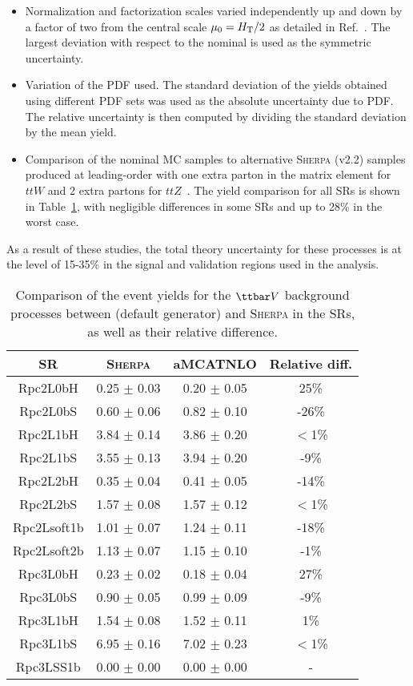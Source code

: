 \begin{itemize}
\item Normalization and factorization scales varied independently up and down by a factor of two from the central scale $\mu_0 = H_{\rm T}/2$ as detailed in Ref.~\cite{ATL-PHYS-PUB-2016-005}. 
The largest deviation with respect to the nominal is used as the symmetric uncertainty.
\item Variation of the PDF used.
The standard deviation of the yields obtained using different PDF sets was used as the absolute uncertainty due to PDF. 
The relative uncertainty is then computed by dividing the standard deviation by the mean yield.
\item Comparison of the nominal \AMCATNLO MC samples to alternative \textsc{Sherpa} (v2.2) samples produced at leading-order with one extra parton in the matrix element for $ttW$ and 2 extra partons 
for $ttZ$~\cite{ATL-PHYS-PUB-2016-005}. 
The yield comparison for all SRs is shown in Table~\ref{tab:ttVGenComp}, with negligible differences in some SRs and up to 28\% in the worst case.
\end{itemize}
As a result of these studies, the total theory uncertainty for these processes 
is at the level of 15-35\% in the signal and validation regions used in the 
analysis. 
\begin{table}[!htb]
\caption{Comparison of the event yields for the $\ttbar V$ background processes between \AMCATNLO (default generator) and \textsc{Sherpa} in the SRs, as well as their relative difference.
}
\label{tab:ttVGenComp}
\def\arraystretch{1.1}
\centering
\begin{tabular}{|c|c|c|c|}
\hline\hline
   SR    & \textsc{Sherpa} & aMCATNLO & Relative diff.\\ \hline
Rpc2L0bH   &   0.25 $\pm$ 0.03   &   0.20 $\pm$ 0.05   &   25\% \\
Rpc2L0bS   &   0.60 $\pm$ 0.06   &   0.82 $\pm$ 0.10   &   -26\% \\
Rpc2L1bH   &   3.84 $\pm$ 0.14   &   3.86 $\pm$ 0.20   &   $<$1\% \\
Rpc2L1bS   &   3.55 $\pm$ 0.13   &   3.94 $\pm$ 0.20   &   -9\% \\
Rpc2L2bH   &   0.35 $\pm$ 0.04   &   0.41 $\pm$ 0.05   &   -14\% \\
Rpc2L2bS   &   1.57 $\pm$ 0.08   &   1.57 $\pm$ 0.12   &   $<$1\% \\
Rpc2Lsoft1b   &   1.01 $\pm$ 0.07   &   1.24 $\pm$ 0.11   &   -18\% \\
Rpc2Lsoft2b   &   1.13 $\pm$ 0.07   &   1.15 $\pm$ 0.10   &   -1\% \\
Rpc3L0bH   &   0.23 $\pm$ 0.02   &   0.18 $\pm$ 0.04   &   27\% \\
Rpc3L0bS   &   0.90 $\pm$ 0.05   &   0.99 $\pm$ 0.09   &   -9\% \\
Rpc3L1bH   &   1.54 $\pm$ 0.08   &   1.52 $\pm$ 0.11   &   1\% \\
Rpc3L1bS   &   6.95 $\pm$ 0.16   &   7.02 $\pm$ 0.23   &   $<$1\% \\
Rpc3LSS1b   &   0.00 $\pm$ 0.00   &   0.00 $\pm$ 0.00   &   - \\
\hline\hline
\end{tabular}
\end{table}

